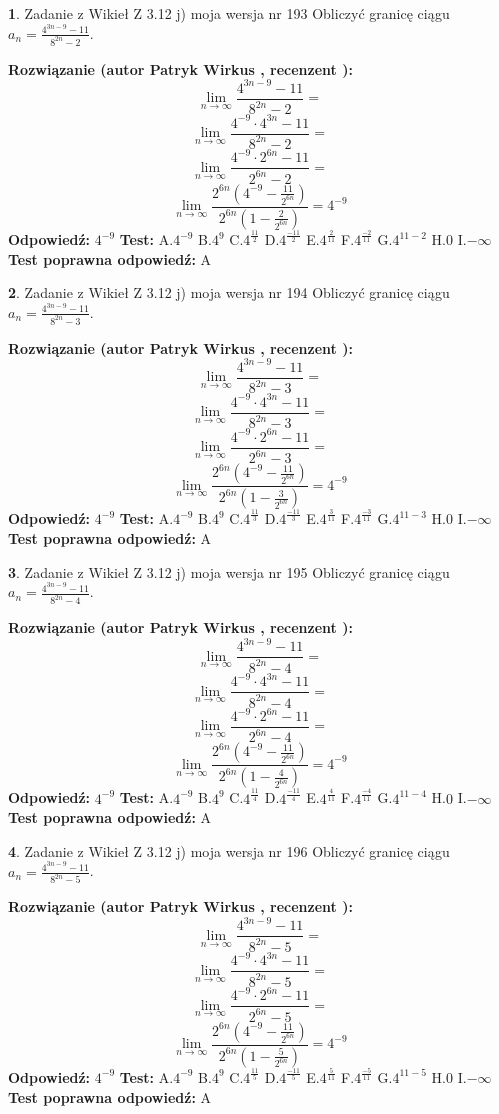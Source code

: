 \documentclass[12pt, a4paper]{article}
\theoremstyle{definition} %
\newtheorem{zad}{}
\newcommand{\zadStart}[1]{\begin{zad}#1\newline}
\newcommand{\zadStop}{\end{zad}}
\newcommand{\rozwStart}[2]{\noindent \textbf{Rozwiązanie (autor #1 , recenzent #2): }\newline}
\newcommand{\rozwStop}{\newline}
\newcommand{\odpStart}{\noindent \textbf{Odpowiedź:}\newline}
\newcommand{\odpStop}{\newline}
\newcommand{\testStart}{\noindent \textbf{Test:}\newline}
\newcommand{\testStop}{\newline}
\newcommand{\kluczStart}{\noindent \textbf{Test poprawna odpowiedź:}\newline}
\newcommand{\kluczStop}{\newline}
\begin{document}
\zadStart{Zadanie z Wikieł Z 3.12 j) moja wersja nr 193}
Obliczyć granicę ciągu $a_{n}=\frac{4^{3n-9}-11}{8^{2n}-2}$.
\zadStop
\rozwStart{Patryk Wirkus}{}
$$\lim\limits_{n\to\infty}\frac{4^{3n-9}-11}{8^{2n}-2}=$$
$$\lim\limits_{n\to\infty}\frac{4^{-9} \cdot 4^{3n}-11}{8^{2n}-2}=$$
$$\lim\limits_{n\to\infty}\frac{4^{-9} \cdot 2^{6n}-11}{2^{6n}-2}=$$
$$\lim\limits_{n\to\infty}\frac{2^{6n}(4^{-9} - \frac{11}{2^{6n}})}{2^{6n}(1-\frac{2}{2^{6n}})}= 4^{-9}$$
\rozwStop
\odpStart
$4^{-9}$
\odpStop
\testStart
A.$4^{-9}$
B.$4^{9}$
C.$4^{\frac{11}{2}}$
D.$4^{\frac{-11}{2}}$
E.$4^{\frac{2}{11}}$
F.$4^{\frac{-2}{11}}$
G.$4^{11-2}$
H.$0$
I.$-\infty$
\testStop
\kluczStart
A
\kluczStop



\zadStart{Zadanie z Wikieł Z 3.12 j) moja wersja nr 194}
Obliczyć granicę ciągu $a_{n}=\frac{4^{3n-9}-11}{8^{2n}-3}$.
\zadStop
\rozwStart{Patryk Wirkus}{}
$$\lim\limits_{n\to\infty}\frac{4^{3n-9}-11}{8^{2n}-3}=$$
$$\lim\limits_{n\to\infty}\frac{4^{-9} \cdot 4^{3n}-11}{8^{2n}-3}=$$
$$\lim\limits_{n\to\infty}\frac{4^{-9} \cdot 2^{6n}-11}{2^{6n}-3}=$$
$$\lim\limits_{n\to\infty}\frac{2^{6n}(4^{-9} - \frac{11}{2^{6n}})}{2^{6n}(1-\frac{3}{2^{6n}})}= 4^{-9}$$
\rozwStop
\odpStart
$4^{-9}$
\odpStop
\testStart
A.$4^{-9}$
B.$4^{9}$
C.$4^{\frac{11}{3}}$
D.$4^{\frac{-11}{3}}$
E.$4^{\frac{3}{11}}$
F.$4^{\frac{-3}{11}}$
G.$4^{11-3}$
H.$0$
I.$-\infty$
\testStop
\kluczStart
A
\kluczStop



\zadStart{Zadanie z Wikieł Z 3.12 j) moja wersja nr 195}
Obliczyć granicę ciągu $a_{n}=\frac{4^{3n-9}-11}{8^{2n}-4}$.
\zadStop
\rozwStart{Patryk Wirkus}{}
$$\lim\limits_{n\to\infty}\frac{4^{3n-9}-11}{8^{2n}-4}=$$
$$\lim\limits_{n\to\infty}\frac{4^{-9} \cdot 4^{3n}-11}{8^{2n}-4}=$$
$$\lim\limits_{n\to\infty}\frac{4^{-9} \cdot 2^{6n}-11}{2^{6n}-4}=$$
$$\lim\limits_{n\to\infty}\frac{2^{6n}(4^{-9} - \frac{11}{2^{6n}})}{2^{6n}(1-\frac{4}{2^{6n}})}= 4^{-9}$$
\rozwStop
\odpStart
$4^{-9}$
\odpStop
\testStart
A.$4^{-9}$
B.$4^{9}$
C.$4^{\frac{11}{4}}$
D.$4^{\frac{-11}{4}}$
E.$4^{\frac{4}{11}}$
F.$4^{\frac{-4}{11}}$
G.$4^{11-4}$
H.$0$
I.$-\infty$
\testStop
\kluczStart
A
\kluczStop



\zadStart{Zadanie z Wikieł Z 3.12 j) moja wersja nr 196}
Obliczyć granicę ciągu $a_{n}=\frac{4^{3n-9}-11}{8^{2n}-5}$.
\zadStop
\rozwStart{Patryk Wirkus}{}
$$\lim\limits_{n\to\infty}\frac{4^{3n-9}-11}{8^{2n}-5}=$$
$$\lim\limits_{n\to\infty}\frac{4^{-9} \cdot 4^{3n}-11}{8^{2n}-5}=$$
$$\lim\limits_{n\to\infty}\frac{4^{-9} \cdot 2^{6n}-11}{2^{6n}-5}=$$
$$\lim\limits_{n\to\infty}\frac{2^{6n}(4^{-9} - \frac{11}{2^{6n}})}{2^{6n}(1-\frac{5}{2^{6n}})}= 4^{-9}$$
\rozwStop
\odpStart
$4^{-9}$
\odpStop
\testStart
A.$4^{-9}$
B.$4^{9}$
C.$4^{\frac{11}{5}}$
D.$4^{\frac{-11}{5}}$
E.$4^{\frac{5}{11}}$
F.$4^{\frac{-5}{11}}$
G.$4^{11-5}$
H.$0$
I.$-\infty$
\testStop
\kluczStart
A
\kluczStop
\end{document}
